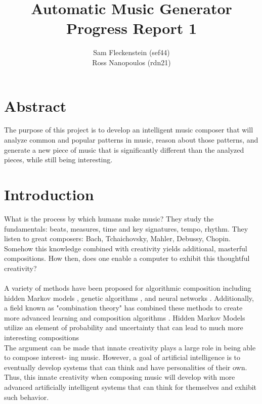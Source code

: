\documentclass{article}
\begin{document}
\clearpage
{}
\begin{center}
\begin{minipage}{.6\textwidth}

\title{Automatic Music Generator \\ \vspace{2 pt} \Large{Progress Report 1}}
\author{Sam Fleckenstein (sef44) \\ Ross Nanopoulos (rdn21)}
\maketitle

\end{minipage}
\end{center}
\clearpage

\tableofcontents
\newpage

\section{Abstract}
The purpose of this project is to develop an intelligent music composer that will analyze common and 
popular patterns in music, reason about those patterns, and generate a new piece of music that is 
significantly different than the analyzed pieces, while still being interesting.

\newpage

\section{Introduction}
What is the process by which humans make music? They study the fundamentals: beats, measures, time
and key signatures, tempo, rhythm. They listen to great composers: Bach, Tchaichovsky, Mahler, Debussy,
Chopin. Somehow this knowledge combined with creativity yields additional, masterful compositions. How
then, does one enable a computer to exhibit this thoughtful creativity?\\
\\
A variety of methods have been proposed for algorithmic composition including hidden Markov models 
\cite{5492670}, genetic algorithms \cite{514161}, and neural networks \cite{4667040}. Additionally, 
a field known as "combination theory" has combined these methods to create more advanced learning and 
composition algorithms \cite{4626654}. Hidden Markov Models utilize an element of probability and 
uncertainty that can lead to much more interesting compositions
\\
The argument can be made that innate creativity plays a large role in being able to compose interest-
ing music. However, a goal of artificial intelligence is to eventually develop systems that can think and
have personalities of their own. Thus, this innate creativity when composing music will develop with more
advanced artificially intelligent systems that can think for themselves and exhibit such behavior.
\end{document}
